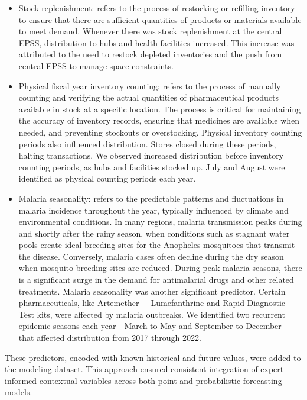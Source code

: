 \documentclass[
  authoryear,
  preprint,
  3p]{elsarticle}
\begin{document}
\begin{itemize}
\item
  Stock replenishment: refers to the process of restocking or refilling
  inventory to ensure that there are sufficient quantities of products
  or materials available to meet demand. Whenever there was stock
  replenishment at the central EPSS, distribution to hubs and health
  facilities increased. This increase was attributed to the need to
  restock depleted inventories and the push from central EPSS to manage
  space constraints.
\item
  Physical fiscal year inventory counting: refers to the process of
  manually counting and verifying the actual quantities of
  pharmaceutical products available in stock at a specific location. The
  process is critical for maintaining the accuracy of inventory records,
  ensuring that medicines are available when needed, and preventing
  stockouts or overstocking. Physical inventory counting periods also
  influenced distribution. Stores closed during these periods, halting
  transactions. We observed increased distribution before inventory
  counting periods, as hubs and facilities stocked up. July and August
  were identified as physical counting periods each year.
\item
  Malaria seasonality: refers to the predictable patterns and
  fluctuations in malaria incidence throughout the year, typically
  influenced by climate and environmental conditions. In many regions,
  malaria transmission peaks during and shortly after the rainy season,
  when conditions such as stagnant water pools create ideal breeding
  sites for the Anopheles mosquitoes that transmit the disease.
  Conversely, malaria cases often decline during the dry season when
  mosquito breeding sites are reduced. During peak malaria seasons,
  there is a significant surge in the demand for antimalarial drugs and
  other related treatments. Malaria seasonality was another significant
  predictor. Certain pharmaceuticals, like Artemether + Lumefanthrine
  and Rapid Diagnostic Test kits, were affected by malaria outbreaks. We
  identified two recurrent epidemic seasons each year---March to May and
  September to December---that affected distribution from 2017 through
  2022.
\end{itemize}

These predictors, encoded with known historical and future values, were
added to the modeling dataset. This approach ensured consistent
integration of expert-informed contextual variables across both point
and probabilistic forecasting models.
\end{document}
